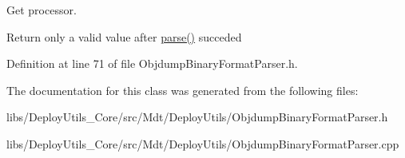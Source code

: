 Get processor. 

Return only a valid value after \hyperlink{class_mdt_1_1_deploy_utils_1_1_objdump_binary_format_parser_a83e87522f42004c12d61301bbc0f1b3d}{parse()} succeded 

Definition at line 71 of file Objdump\+Binary\+Format\+Parser.\+h.



The documentation for this class was generated from the following files\+:\begin{DoxyCompactItemize}
\item 
libs/\+Deploy\+Utils\+\_\+\+Core/src/\+Mdt/\+Deploy\+Utils/Objdump\+Binary\+Format\+Parser.\+h\item 
libs/\+Deploy\+Utils\+\_\+\+Core/src/\+Mdt/\+Deploy\+Utils/Objdump\+Binary\+Format\+Parser.\+cpp\end{DoxyCompactItemize}
